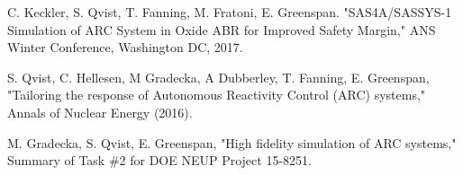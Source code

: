 \documentclass[11pt, oneside]{article}   	%
\begin{document}
\begin{thebibliography}{9}

C. Keckler, S. Qvist, T. Fanning, M. Fratoni, E. Greenspan. "SAS4A/SASSYS-1 Simulation of ARC System in Oxide ABR for Improved Safety Margin," ANS Winter Conference, Washington DC, 2017.

S. Qvist, C. Hellesen, M Gradecka, A Dubberley, T. Fanning, E. Greenspan, "Tailoring the response of Autonomous Reactivity Control (ARC) systems," Annals of Nuclear Energy (2016).

M. Gradecka, S. Qvist, E. Greenspan, "High fidelity simulation of ARC systems," Summary of Task \#2 for DOE NEUP Project 15-8251.

\end{thebibliography}
\end{document}
